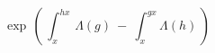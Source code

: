 \begin{equation}  \label{phstart}
\exp \, \left( \, \int^{hx}_x \, \Lambda(g) \: - \:
\int^{gx}_x \Lambda(h) \, \right)
\end{equation}


